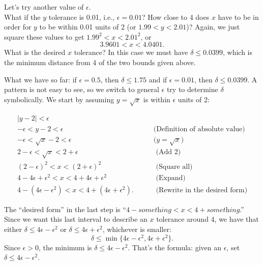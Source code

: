 {Let's try another value of $\epsilon$.\\

What if the $y$ tolerance is 0.01, i.e.,  $\epsilon =0.01$?  How close to 4 does $x$ have to be in order for $y$ to be within 0.01 units of 2 (or $1.99 < y < 2.01$)?  Again, we just square these values to get
$1.99^2 < x < 2.01^2$, or 
\[3.9601 < x < 4.0401\text{.}\]
What is the desired $x$ tolerance?  In this case we must have $\delta \leq 0.0399$, which is the minimum distance from 4 of the two bounds given above.  %

What we have so far: if $\epsilon =0.5$, then $\delta \leq 1.75$ and if $\epsilon = 0.01$, then $\delta \leq 0.0399$. A pattern is not easy to see, so we switch to general $\epsilon$ try to determine $\delta$ symbolically.  We start by assuming $y=\sqrt{x}$ is within $\epsilon$ units of 2:

\drawexampleline

\begin{eqnarray*}
|y - 2| < \epsilon &\\
-\epsilon < y - 2 < \epsilon& \qquad \textrm{(Definition of absolute value)}\\
-\epsilon < \sqrt{x} - 2 < \epsilon  &\qquad\text{($y=\sqrt{x}$)}\\
2 - \epsilon < \sqrt{x} < 2+ \epsilon &\qquad \textrm{ (Add 2)}\\
(2 - \epsilon)^2 < x < (2+ \epsilon) ^2 &\qquad \textrm{ (Square all)}\\
4 - 4\epsilon + \epsilon^2 < x < 4 + 4\epsilon + \epsilon^2 &\qquad \textrm{ (Expand)}\\
4 - (4\epsilon - \epsilon^2) < x < 4 + (4\epsilon + \epsilon^2)\text{.} &\qquad \textrm{ (Rewrite in the desired form)}
\end{eqnarray*}

The ``desired form'' in the last step is ``$4-\textit{something} < x < 4 +\textit{something}$.''
Since we want this last interval to describe an $x$ tolerance around 4, we have that either $\delta \leq 4\epsilon - \epsilon^2$ or $\delta \leq 4\epsilon + \epsilon^2$, whichever is smaller: \[\delta \leq \min\{4\epsilon - \epsilon^2, 4\epsilon + \epsilon^2\}\text{.}\]  Since $\epsilon > 0$, the minimum is $\delta \leq 4\epsilon - \epsilon^2$.  That's the formula: given an $\epsilon$, set $\delta \leq 4\epsilon-\epsilon^2$. 

}
